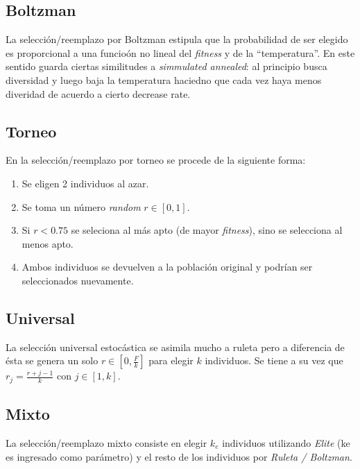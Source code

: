 \documentclass[%
    final,
    reprint,
    notitlepage,
    narroweqnarray,
    inline,
    twoside,
    invited
    ]{ieee}
\begin{document}
\subsection{Boltzman}

\par La selección/reemplazo por Boltzman estipula que la probabilidad de ser elegido es proporcional a una funcioón no lineal del \textit{fitness} y de la ``temperatura''. En este sentido guarda ciertas similitudes a \textit{simmulated annealed}: al principio busca diversidad y luego baja la temperatura haciedno que cada vez haya menos diveridad de acuerdo a cierto decrease rate.

\subsection{Torneo}

En la selección/reemplazo por torneo se procede de la siguiente forma:

\begin{enumerate}
\item Se eligen 2 individuos al azar. 
\item Se toma un número \textit{random} $r \in [0, 1]$.
\item Si $r < 0.75$ se seleciona al más apto (de mayor \textit{fitness}), sino se selecciona al menos apto.
\item Ambos individuos se devuelven a la población original y podrían ser seleccionados nuevamente.
\end{enumerate}

\subsection{Universal}

\par La selección universal estocástica se asimila mucho a ruleta pero a diferencia de ésta se genera un solo $r \in [0, \frac{F}{k}]$ para elegir $k$ individuos.  Se tiene a su vez que $r_j = \frac{r + j-1}{k}$ con $j \in [1,k]$.

\subsection{Mixto}

La selección/reemplazo mixto consiste en elegir $k_e$ individuos utilizando \textit{Elite} (ke es ingresado como parámetro) y el resto de los individuos por \textit{Ruleta / Boltzman}.
\end{document}
